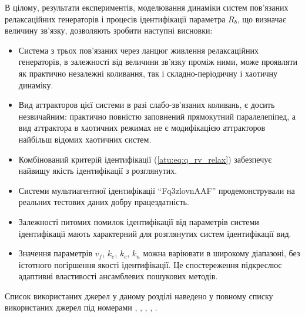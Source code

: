 В цілому, результати експериментів, моделювання динаміки систем
пов'язаних релаксаційних генераторів і процесів ідентифікації
параметра
$R_b $, що визначає величину зв'язку, дозволяють зробити
наступні висновки:

\begin{itemize}

  \item
    Система з трьох пов'язаних через ланцюг живлення релаксаційних
    генераторів, в залежності від величини зв'язку проміж ними,
    може проявляти як практично незалежні коливання, так і
    складно-періодичну і хаотичну динаміку.


  \item
    Вид аттракторов цієї системи в разі слабо-зв'язаних коливань, є
    досить незвичайним: практично повністю заповнений прямокутний
    паралелепіпед, а вид аттрактора в хаотичних режимах не є
    модифікацією аттракторов найбільш відомих хаотичних систем.


  \item
    Комбінований критерій ідентифікації (\ref{atu:eq:q_rv_relax}) забезпечує
    найвищу якість ідентифікації з розглянутих.

  \item
    Системи мультиагентної ідентифікації ``Fq3zlovnAAF''
    продемонстрували на реальних тестових даних добру
    працездатність.

  \item
    Залежності питомих помилок ідентифікації від параметрів
    системи ідентифікації мають характерний для розглянутих систем
    ідентифікації вид.

  \item
    Значення параметрів
    $v_f$,
    $k_e$,
    $k_c$,
    $k_n$ можна варіювати в широкому діапазоні, без істотного
    погіршення якості ідентифікації. Це спостереження підкреслює
    адаптивні властивості ансамблевих пошукових методів.

\end{itemize}


Список використаних джерел у даному розділі наведено у повному
списку використаних джерел під номерами
\cite{horowitz},
\cite{atu_st104b},
\cite{atu_asau19},
\cite{kennedy1999},
\cite{atu_st107}.


